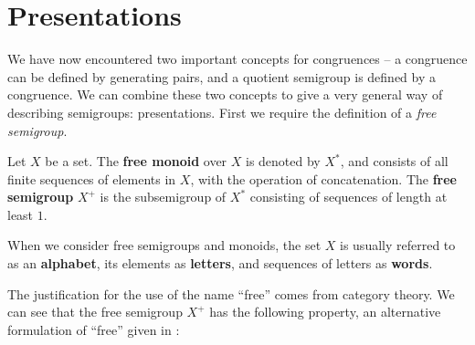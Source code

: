 \section{Presentations}
\label{sec:intro-presentations}

We have now encountered two important concepts for congruences -- a congruence
can be defined by generating pairs, and a quotient semigroup is defined by a
congruence.  We can combine these two concepts to give a very general way of
describing semigroups: presentations.  First we require the definition of a
\textit{free semigroup}.

\begin{definition}
  \label{def:free}
  Let $X$ be a set.  The \textbf{free monoid} over $X$ is denoted by $X^*$, and
  consists of all finite sequences of elements in $X$, with the operation of
  concatenation.  The \textbf{free semigroup} $X^+$ is the subsemigroup of $X^*$
  consisting of sequences of length at least $1$.
\end{definition}

When we consider free semigroups and monoids, the set $X$ is usually referred to
as an \textbf{alphabet}, its elements as \textbf{letters}, and sequences of
letters as \textbf{words}.
  

The justification for the use of the name ``free'' comes from category theory.
We can see that the free semigroup $X^+$ has the following property, an
alternative formulation of ``free'' given in \cite[\S 1.6]{howie}:

